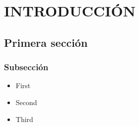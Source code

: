 \chapter{INTRODUCCIÓN}
\label{ch:intro}

\section{Primera sección}
\blindtext

\subsection{Subsección}
\blindtext

\begin{itemize}
    \item First
    \item Second
    \item Third
\end{itemize}

